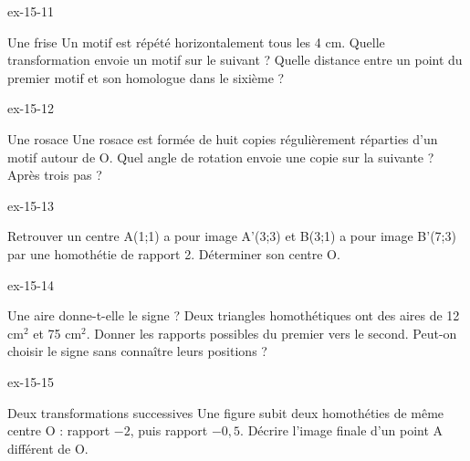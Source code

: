 \clearpage{}
\begin{blocLivre}{ex-15-11}\begin{exercice}[3]{Une frise}
Un motif est répété horizontalement tous les 4 cm. Quelle transformation envoie un motif sur le suivant ? Quelle distance entre un point du premier motif et son homologue dans le sixième ?
\label{fig-ex-15-11}
\end{exercice}\end{blocLivre}
\begin{blocLivre}{ex-15-12}\begin{exercice}[3]{Une rosace}
Une rosace est formée de huit copies régulièrement réparties d’un motif autour de O. Quel angle de rotation envoie une copie sur la suivante ? Après trois pas ?
\label{fig-ex-15-12}
\end{exercice}\end{blocLivre}
\begin{blocLivre}{ex-15-13}\begin{exercice}[3]{Retrouver un centre}
A(1;1) a pour image A’(3;3) et B(3;1) a pour image B’(7;3) par une homothétie de rapport 2. Déterminer son centre O.
\label{fig-ex-15-13}
\end{exercice}\end{blocLivre}
\begin{blocLivre}{ex-15-14}\begin{exercice}[3]{Une aire donne-t-elle le signe ?}
Deux triangles homothétiques ont des aires de 12 cm$^2$ et 75 cm$^2$. Donner les rapports possibles du premier vers le second. Peut-on choisir le signe sans connaître leurs positions ?
\label{fig-ex-15-14}
\end{exercice}\end{blocLivre}
\begin{blocLivre}{ex-15-15}\begin{exercice}[3]{Deux transformations successives}
Une figure subit deux homothéties de même centre O : rapport $-2$, puis rapport $-0{,}5$. Décrire l’image finale d’un point A différent de O.
\label{fig-ex-15-15}
\end{exercice}\end{blocLivre}

\clearpage
